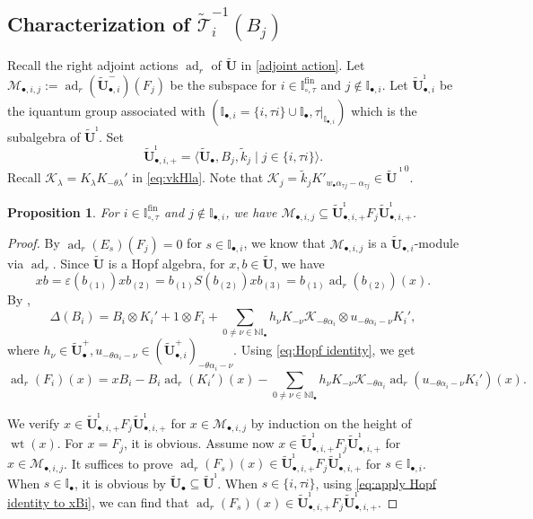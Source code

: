 \documentclass[a4paper,reqno,12pt]{amsart}
\numberwithin{equation}{section}
\newtheorem{proposition}{Proposition}[section]
\theoremstyle{definition}
\theoremstyle{plain}
\theoremstyle{definition}
\def\N{\mathbb N}
\def\I{\mathbb I}
\def\bI{\I_\bullet}
\def\bIi{\I_{\bullet,i}}
\def\bw{w_\bullet}
\def\tU{\widetilde{\mathbf U}}
\def\tUi{\widetilde{\mathbf U}^{\imath}}
\def \tbU{\tU_{\bullet}}
\def \tbiU{\tU_{\bullet,i}}
\def\tT{\widetilde{\mathscr T}}
\def\tk{\widetilde k}
\def\cM{\mathcal M}
\def\cK{\mathcal K}
\def \wItau{\I_{\circ,\tau}}
\def \fwItau{\wItau^{\mathrm{fin}}}
\newcommand{\ad}{\operatorname{ad}}
\newcommand{\wt}{\operatorname{wt}}
\newcommand{\redtext}[1]{\textcolor{red}{#1}}
\newcommand{\red}[1]{\redtext{ #1}}
\begin{document}
\subsection{Characterization of $\tT_i^{-1}(B_j)$}
Recall the right adjoint actions $\ad_r$ of $\tU$ in \eqref{adjoint action}. Let $\cM_{\bullet,i,j}:=\ad_r(\tbiU^-)(F_j)$ be the subspace for $i\in\fwItau$ and $j\notin \bIi$. Let $\tbiU^\imath$ be the iquantum group  associated with $(\bIi=\{i,\tau i\}\cup\bI,\tau|_{\bIi})$ which is the subalgebra of $\tUi$. Set
 $$\tU^\imath_{\bullet,i,+}=\langle\tbU,B_{j},\tk_j\mid j\in\{i,\tau i\}\rangle.$$
 Recall $\cK_\lambda=K_\lambda K_{-\theta\lambda}'$ in \eqref{eq:vkHla}. Note that $\cK_j=\tk_jK'_{\bw\alpha_{\tau j}-\alpha_{\tau j}}\in\tU^{\imath 0}$.
\begin{proposition}\label{prop:Mij-subset-BFB}
  For $i\in\fwItau$ and $j\notin \bIi$, we have $\cM_{\bullet,i,j}\subseteq\tU^\imath_{\bullet,i,+}F_j\tU^\imath_{\bullet,i,+}$.
\end{proposition}
\begin{proof}
By $\ad_r(E_s)(F_j)=0$ for $s\in\bIi$, we know that $\cM_{\bullet,i,j}$ is a $\tbiU$-module via $\ad_r$. Since $\tU$ is a Hopf algebra, for $x,b\in\tU$, we have 
   \begin{equation}\label{eq:Hopf identity}
xb=\varepsilon(b_{(1)})xb_{(2)}=b_{(1)}S(b_{(2)})xb_{(3)}=b_{(1)}\ad_r(b_{(2)})(x).
   \end{equation}
By \cite[Lemma 2.6]{KY26}, 
\begin{equation*}
 \Delta(B_i)=B_i\otimes K_i'+1\otimes F_i+\sum_{0\ne\nu\in\N\bI}h_\nu K_{-\nu}\cK_{-\theta\alpha_i}\otimes u_{-\theta\alpha_i-\nu}K_i',
\end{equation*}
where $h_\nu\in\tbU^+,u_{-\theta\alpha_i-\nu}\in(\tbiU^+)_{-\theta\alpha_i-\nu }$. Using \eqref{eq:Hopf identity}, we get
\begin{equation}\label{eq:apply Hopf identity to xBi}
  \ad_r(F_i)(x)=xB_i-B_i\ad_r(K_i')(x)-\sum_{0\ne\nu\in\N\bI}h_\nu K_{-\nu}\cK_{-\theta\alpha_i}\ad_r( u_{-\theta\alpha_i-\nu}K_i')(x). 
\end{equation}

We verify $x\in \tU^\imath_{\bullet,i,+}F_j\tU^\imath_{\bullet,i,+}$ for $x\in\cM_{\bullet,i,j}$ by induction on the height of $\wt(x)$. For $x=F_j$, it is obvious. Assume now $x\in\tU^\imath_{\bullet,i,+}F_j\tU^\imath_{\bullet,i,+}$ for $x\in\cM_{\bullet,i,j}$. It suffices to prove $\ad_r(F_s)(x)\in\tU^\imath_{\bullet,i,+}F_j\tU^\imath_{\bullet,i,+}$ for $s\in\bIi$. When $s\in\bI$, it is obvious by $\tbU\subseteq\tUi$. When $s\in\{i,\tau i\}$, using \eqref{eq:apply Hopf identity to xBi}, we can find that $\ad_r(F_s)(x)\in\tU^\imath_{\bullet,i,+}F_j\tU^\imath_{\bullet,i,+}$.

\end{proof}
\end{document}
